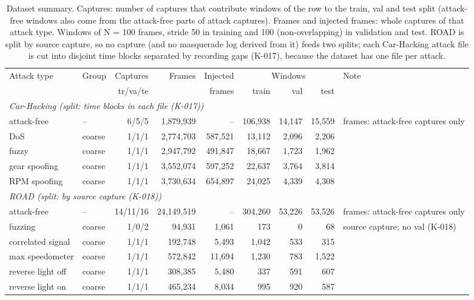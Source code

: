 \begin{table}[t]
\centering
\footnotesize
\caption{Dataset summary. Captures: number of captures that contribute windows of the row to the train, val and test split (attack-free windows also come from the attack-free parts of attack captures). Frames and injected frames: whole captures of that attack type. Windows of N = 100 frames, stride 50 in training and 100 (non-overlapping) in validation and test. ROAD is split by source capture, so no capture (and no masquerade log derived from it) feeds two splits; each Car-Hacking attack file is cut into disjoint time blocks separated by recording gaps (K-017), because the dataset has one file per attack.}
\label{tab:dataset}
\begin{tabular}{@{}llrrrrrrl@{}}
\toprule
Attack type & Group & Captures & Frames & Injected & \multicolumn{3}{c}{Windows} & Note \\
\cmidrule(lr){6-8}
& & tr/va/te & & frames & train & val & test & \\
\midrule
\multicolumn{9}{l}{\textit{Car-Hacking (split: time blocks in each file (K-017))}} \\
attack-free & -- & 6/5/5 & 1,879,939 & -- & 106,938 & 14,147 & 15,559 & frames: attack-free captures only \\
DoS & coarse & 1/1/1 & 2,774,703 & 587,521 & 13,112 & 2,096 & 2,206 &  \\
fuzzy & coarse & 1/1/1 & 2,947,792 & 491,847 & 18,667 & 1,723 & 1,962 &  \\
gear spoofing & coarse & 1/1/1 & 3,552,074 & 597,252 & 22,637 & 3,764 & 3,814 &  \\
RPM spoofing & coarse & 1/1/1 & 3,730,634 & 654,897 & 24,025 & 4,339 & 4,308 &  \\
\midrule
\multicolumn{9}{l}{\textit{ROAD (split: by source capture (K-018))}} \\
attack-free & -- & 14/11/16 & 24,149,519 & -- & 304,260 & 53,226 & 53,526 & frames: attack-free captures only \\
fuzzing & coarse & 1/0/2 & 94,931 & 1,061 & 173 & 0 & 68 & source capture; no val (K-018) \\
correlated signal & coarse & 1/1/1 & 192,748 & 5,493 & 1,042 & 533 & 315 &  \\
max speedometer & coarse & 1/1/1 & 572,842 & 11,694 & 1,230 & 783 & 1,522 &  \\
reverse light off & coarse & 1/1/1 & 308,385 & 5,480 & 337 & 591 & 607 &  \\
reverse light on & coarse & 1/1/1 & 465,234 & 8,034 & 995 & 920 & 587 &  \\

\end{tabular}
\end{table}
